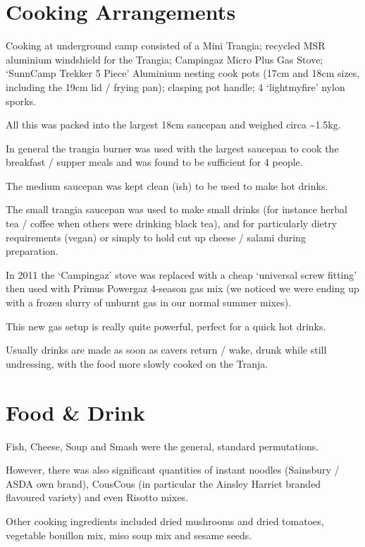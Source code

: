 \section{Cooking Arrangements}

Cooking at underground camp consisted of a Mini Trangia; recycled MSR aluminium windshield for the Trangia; Campingaz Micro Plus Gas Stove; `SunnCamp Trekker 5 Piece' Aluminium nesting cook pots (17cm and 18cm sizes, including the 19cm lid / frying pan); clasping pot handle; 4 `lightmyfire' nylon sporks.

All this was packed into the largest 18cm saucepan and weighed circa \textasciitilde{}1.5kg.

In general the trangia burner was used with the largest saucepan to cook the breakfast / supper meals and was found to be sufficient for 4 people.

The medium saucepan was kept clean (ish) to be used to make hot drinks.

The small trangia saucepan was used to make small drinks (for instance herbal tea / coffee when others were drinking black tea), and for particularly dietry requirements (vegan) or simply to hold cut up cheese / salami during preparation.

In 2011 the `Campingaz' stove was replaced with a cheap `universal screw fitting' then used with Primus Powergaz 4-season gas mix (we noticed we were ending up with a frozen slurry of unburnt gas in our normal summer mixes).

This new gas setup is really quite powerful, perfect for a quick hot drinks.

Usually drinks are made as soon as cavers return / wake, drunk while still undressing, with the food more slowly cooked on the Tranja.


\section{Food \& Drink}

Fish, Cheese, Soup and Smash were the general, standard permutations.

However, there was also significant quantities of instant noodles (Sainsbury / ASDA own brand), CousCous (in particular the Ainsley Harriet branded flavoured variety) and even Risotto mixes.

Other cooking ingredients included dried mushrooms and dried tomatoes, vegetable bouillon mix, miso soup mix and sesame seeds.

